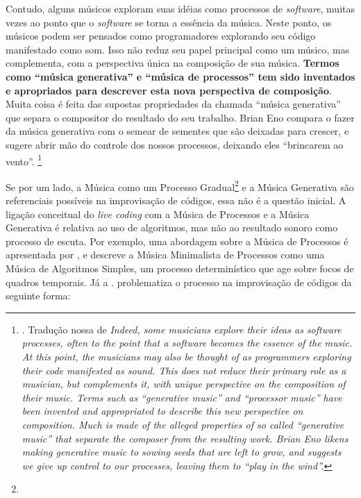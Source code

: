 \begin{citacao}
Contudo, alguns músicos exploram suas idéias como processos de \emph{software}, muitas vezes ao ponto que o \emph{software} se torna a essência da música. Neste ponto, os músicos podem ser pensados como programadores explorando seu código manifestado como som. Isso não reduz seu papel principal como um músico, mas complementa, com a perspectiva única na composição de sua música. \textbf{Termos como ``música generativa'' e ``música de processos'' tem sido inventados e apropriados para descrever esta nova perspectiva de composição}. Muita coisa é feita das supostas propriedades da chamada ``música generativa'' que separa o compositor do resultado do seu trabalho. Brian Eno compara o fazer da música generativa com o semear de sementes que são deixadas para crescer, e sugere abrir mão do controle dos nossos processos, deixando eles ``brincarem ao vento''. \footnote{. Tradução nossa de \emph{Indeed, some musicians explore their ideas as software processes, often to the point that a software becomes the essence of the music. At this point, the musicians may also be thought of as programmers exploring their code manifested as sound. This does not reduce their primary role as a musician, but complements it, with unique perspective on the composition of their music. Terms such as “generative music” and “processor music” have been invented and appropriated to describe this new perspective on composition. Much is made of the alleged properties of so called “generative music” that separate the composer from the resulting work. Brian Eno likens making generative music to sowing seeds that are left to grow, and suggests we give up control to our processes, leaving them to “play in the wind”.}}
\end{citacao}

Se por um lado, a Música como um Processo Gradual\footnote{} e a Música Generativa são referenciais possíveis na improvisação de códigos, essa não é a questão inicial. A ligação conceitual do \emph{live coding} com a Música de Processos e a Música Generativa é relativa ao uso de algoritmos, mas não ao resultado sonoro como processo de escuta. Por exemplo, uma abordagem sobre a Música de Processos é apresentada por , e descreve a Música Minimalista de Processos como uma Música de Algoritmos Simples,  um processo determinístico que age sobre focos de quadros temporais. Já a \cite{eno_generative_1996}.  problematiza o processo na improvisação de códigos da seguinte forma:

